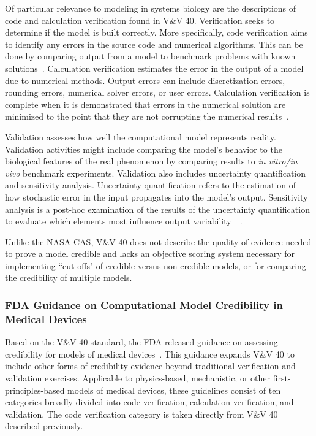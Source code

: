 \documentclass[12pt]{report}
\begin{document}
Of particular relevance to modeling in systems biology are the descriptions of code and calculation verification found in V\&V 40. Verification seeks to determine if the model is built correctly. More specifically, code verification aims to identify any errors in the source code and numerical algorithms. This can be done by comparing output from a model to benchmark problems with known solutions~\cite{viceconti_credibility_2020}. Calculation verification estimates the error in the output of a model due to numerical methods. Output errors can include discretization errors, rounding errors, numerical solver errors, or user errors. Calculation verification is complete when it is demonstrated that errors in the numerical solution are minimized to the point that they are not corrupting the numerical results~\cite{viceconti_credibility_2020}.

Validation assesses how well the computational model represents reality. Validation activities might include comparing the model's behavior to the biological features of the real phenomenon by comparing results to \textit{in vitro/in vivo} benchmark experiments. Validation also includes uncertainty quantification and sensitivity analysis. Uncertainty quantification refers to the estimation of how stochastic error in the input propagates into the model's output. Sensitivity analysis is a post-hoc examination of the results of the uncertainty quantification to evaluate which elements most influence output variability~~\cite{viceconti_credibility_2020}.

Unlike the NASA CAS, V\&V 40 does not describe the quality of evidence needed to prove a model credible and lacks an objective scoring system necessary for implementing ``cut-offs" of credible versus non-credible models, or for comparing the credibility of multiple models.

\subsubsection{FDA Guidance on Computational Model Credibility in Medical Devices}

Based on the V\&V 40 standard, the FDA released guidance on assessing credibility for models of medical devices~\cite{FDAguidelines}. This guidance expands V\&V 40 to include other forms of credibility evidence beyond traditional verification and validation exercises. Applicable to physics-based, mechanistic, or other first-principles-based models of medical devices, these guidelines consist of ten categories broadly divided into code verification, calculation verification, and validation. The code verification category is taken directly from V\&V 40 described previously.
\end{document}
